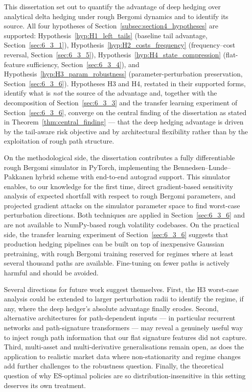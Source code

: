 \documentclass[12pt,a4paper]{article}
\theoremstyle{definition}
\theoremstyle{plain}
\theoremstyle{remark}
\theoremstyle{plain}
\begin{document}
This dissertation set out to quantify the advantage of deep
hedging over analytical delta hedging under rough Bergomi
dynamics and to identify its source. All four hypotheses
of Section~\ref{subsec:section4_hypotheses} are supported:
Hypothesis~\ref{hyp:H1_left_tails} (baseline tail advantage,
Section~\ref{sec:6_3_1}),
Hypothesis~\ref{hyp:H2_costs_frequency} (frequency--cost
reversal, Section~\ref{sec:6_3_5}),
Hypothesis~\ref{hyp:H4_state_compression} (flat-feature sufficiency,
Section~\ref{sec:6_3_4}), and
Hypothesis~\ref{hyp:H3_param_robustness}
(parameter-perturbation preservation, Section~\ref{sec:6_3_6}).
Hypotheses H3 and H4, restated in their supported forms, identify
what is \emph{not} the source of the
advantage and, together with the decomposition of
Section~\ref{sec:6_3_3} and the transfer learning experiment of
Section~\ref{sec:6_3_6}, converge on the central finding of the
dissertation as stated in Theorem~\ref{thm:central_finding}
--- that the deep hedging advantage is driven by the tail-aware
risk objective and by architectural flexibility rather than by
the exploitation of rough path structure.

On the methodological side, the dissertation contributes a fully
differentiable rough Bergomi simulator in PyTorch, implementing
the Bennedsen--Lunde--Pakkanen hybrid scheme with end-to-end
autograd support. This simulator enables, to our knowledge for
the first time, direct gradient-based sensitivity analysis of
expected shortfall with respect to rough Bergomi parameters, and
projected gradient attacks on the simulator parameter space to
find worst-case perturbation directions. Both techniques are
applied in Section~\ref{sec:6_3_6} and are not available to
NumPy-based rough volatility codebases. On the practical side,
the transfer learning experiment of Section~\ref{sec:6_3_6}
suggests that production hedging pipelines can be built on top
of inexpensive Gaussian pretraining, with rough Bergomi training
reserved for regimes where at least several thousand paths are
available. Fine-tuning on fewer paths is actively harmful and
should be avoided.

Several directions for future work suggest themselves. First,
the H3 worst-case analysis could be extended to larger
perturbation radii to identify the regime, if any, where the
deep hedger's absolute advantage finally erodes. Second,
alternative architectures for path-dependent inputs --- in
particular recurrent networks and path-signature transformers
--- may reveal a genuinely useful way to inject rough path
information that our flat signature features did not capture.
Third, multi-asset and multi-derivative generalisations remain
open, as does the application to realistic market data where
non-stationarity and regime changes add further challenges to
the robustness question. Finally, the theoretical question of
why $\mathrm{ES}$-optimal policies are so
distribution-insensitive in this setting deserves its own
treatment.
\end{document}
